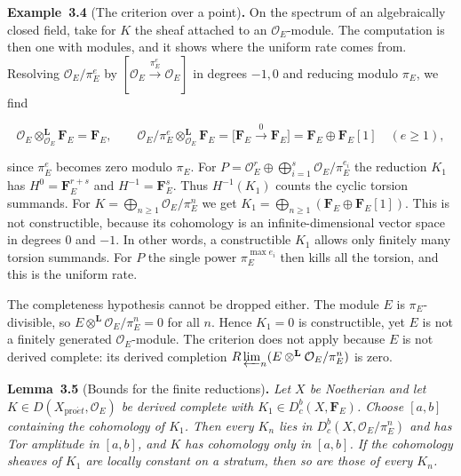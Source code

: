 \documentclass[11pt]{article}
\newenvironment{bpstatement}[2]{\par\addvspace{0.6\baselineskip}\noindent\textbf{#1}#2\textbf{.}\enspace\ignorespaces}
  {\par\addvspace{0.4\baselineskip}}
\newenvironment{bpstatementit}[2]{\begin{bpstatement}{#1}{#2}\itshape\ignorespaces}{\end{bpstatement}}
\providecommand{\Dbc}{}\renewcommand{\Dbc}{D^b_c}
\begin{document}
\label{bp15}%
\begin{bpstatement}{Example~3.4}{ (The criterion over a point)}
On the spectrum of an algebraically closed field, take for \(K\) the sheaf attached to an \(\mathcal O_E\)-module. The computation is then one with modules, and it shows where the uniform rate comes from. Resolving \(\mathcal O_E/\pi_E^e\) by \([\mathcal O_E\xrightarrow{\pi_E^e}\mathcal O_E]\) in degrees \(-1,0\) and reducing modulo \(\pi_E\), we find

\[
\mathcal O_E\otimes^{\mathbf L}_{\mathcal O_E}\mathbf F_E=\mathbf F_E,
\qquad
\mathcal O_E/\pi_E^e\otimes^{\mathbf L}_{\mathcal O_E}\mathbf F_E
=\bigl[\mathbf F_E\xrightarrow{\,0\,}\mathbf F_E\bigr]
=\mathbf F_E\oplus\mathbf F_E[1]\quad(e\geq1),
\]

since \(\pi_E^e\) becomes zero modulo \(\pi_E\). For \(P=\mathcal O_E^r\oplus\bigoplus_{i=1}^s\mathcal O_E/\pi_E^{e_i}\) the reduction \(K_1\) has \(H^0=\mathbf F_E^{r+s}\) and \(H^{-1}=\mathbf F_E^s\). Thus \(H^{-1}(K_1)\) counts the cyclic torsion summands. For \(K=\bigoplus_{n\geq1}\mathcal O_E/\pi_E^n\) we get \(K_1=\bigoplus_{n\geq1}(\mathbf F_E\oplus\mathbf F_E[1])\). This is not constructible, because its cohomology is an infinite-dimensional vector space in degrees \(0\) and \(-1\). In other words, a constructible \(K_1\) allows only finitely many torsion summands. For \(P\) the single power \(\pi_E^{\max e_i}\) then kills all the torsion, and this is the uniform rate.

The completeness hypothesis cannot be dropped either. The module \(E\) is \(\pi_E\)-divisible, so \(E\otimes^{\mathbf L}\mathcal O_E/\pi_E^n=0\) for all \(n\). Hence \(K_1=0\) is constructible, yet \(E\) is not a finitely generated \(\mathcal O_E\)-module. The criterion does not apply because \(E\) is not derived complete: its derived completion \(R\varprojlim_n(E\otimes^{\mathbf L}\mathcal O_E/\pi_E^n)\) is zero.
\end{bpstatement}

\label{bp16}%
\begin{bpstatementit}{Lemma~3.5}{ (Bounds for the finite reductions)}
Let \(X\) be Noetherian and let \(K\in D(X_{\mathrm{pro}\acute{e}t},\mathcal O_E)\) be derived complete with \(K_1\in\Dbc(X,\mathbf F_E)\). Choose \([a,b]\) containing the cohomology of \(K_1\). Then every \(K_n\) lies in \(\Dbc(X,\mathcal O_E/\pi_E^n)\) and has Tor amplitude in \([a,b]\), and \(K\) has cohomology only in \([a,b]\). If the cohomology sheaves of \(K_1\) are locally constant on a stratum, then so are those of every \(K_n\).
\end{bpstatementit}
\end{document}
